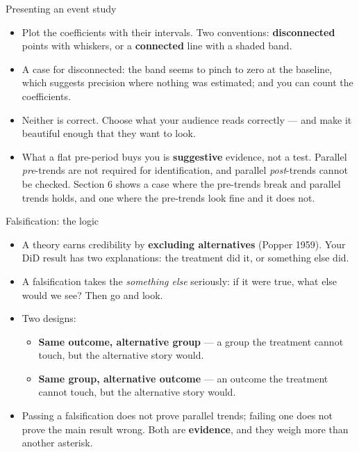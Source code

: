 \documentclass[
  11pt,
  ignorenonframetext,
  aspectratio=169,
]{beamer}
\providecommand{\tightlist}{%
  \setlength{\itemsep}{0pt}\setlength{\parskip}{0pt}}
\begin{document}
\begin{frame}{Presenting an event study}
\protect{}\label{presenting-an-event-study}
\begin{itemize}
\tightlist
\item
  Plot the coefficients with their intervals. Two conventions:
  \textbf{disconnected} points with whiskers, or a \textbf{connected}
  line with a shaded band.
\item
  A case for disconnected: the band seems to pinch to zero at the
  baseline, which suggests precision where nothing was estimated; and
  you can count the coefficients.
\item
  Neither is correct. Choose what your audience reads correctly --- and
  make it beautiful enough that they want to look.
\end{itemize}

\vspace{0.4em}

\begin{itemize}
\tightlist
\item
  What a flat pre-period buys you is \textbf{suggestive} evidence, not a
  test. Parallel \emph{pre}-trends are not required for identification,
  and parallel \emph{post}-trends cannot be checked. Section 6 shows a
  case where the pre-trends break and parallel trends holds, and one
  where the pre-trends look fine and it does not.
\end{itemize}
\end{frame}

\begin{frame}{Falsification: the logic}
\protect{}\label{falsification-the-logic}
\begin{itemize}
\tightlist
\item
  A theory earns credibility by \textbf{excluding alternatives} (Popper
  1959). Your DiD result has two explanations: the treatment did it, or
  something else did.
\item
  A falsification takes the \emph{something else} seriously: if it were
  true, what else would we see? Then go and look.
\item
  Two designs:

  \begin{itemize}
  \tightlist
  \item
    \textbf{Same outcome, alternative group} --- a group the treatment
    cannot touch, but the alternative story would.
  \item
    \textbf{Same group, alternative outcome} --- an outcome the
    treatment cannot touch, but the alternative story would.
  \end{itemize}
\end{itemize}

\vspace{0.3em}

\begin{itemize}
\tightlist
\item
  Passing a falsification does not prove parallel trends; failing one
  does not prove the main result wrong. Both are \textbf{evidence}, and
  they weigh more than another asterisk.
\end{itemize}
\end{frame}
\end{document}
